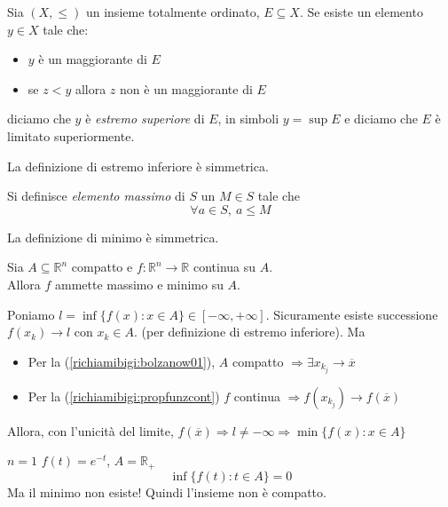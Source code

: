 \begin{defn}
Sia $(X,\leq)$ un insieme totalmente ordinato, $E\subseteq X$.
 Se esiste un elemento $y\in X$ tale che:
\begin{itemize}
\item $y$ è un maggiorante di $E$
\item se $z<y$ allora $z$ non è un maggiorante di $E$
\end{itemize}
diciamo che $y$ è \emph{estremo superiore} di $E$, in simboli
 $y=\sup E$ e diciamo che $E$ è limitato superiormente.
\end{defn}
La definizione di estremo inferiore è simmetrica.

\begin{defn}[Massimo]
Si definisce \emph{elemento massimo} di $S$  un $M \in S$
 tale che
$$\forall a \in S,\ a\leq M$$
\end{defn}
La definizione di minimo è simmetrica.


\begin{theo}
 Sia $A \subseteq \mathbb{R}^n$ compatto e
 $f: \mathbb{R}^{n} \rightarrow \mathbb{R}$ continua su $A$. \\
Allora $f$ ammette massimo e minimo su $A$.
\end{theo}

\begin{thproof}
Poniamo $ l = \inf \{f(x):  x \in A \} \in [ -\infty, + \infty]$.
Sicuramente esiste successione $f(x_k) \rightarrow l$ con $x_k \in A$. (per definizione di estremo inferiore). Ma
\begin{itemize}
\item Per la  (\ref{richiamibigi:bolzanow01}), $A$ compatto $\Rightarrow \exists x_{k_{j}} \rightarrow \overline{x}$

\item  Per la  (\ref{richiamibigi:propfunzcont})
$f$ continua $\Rightarrow  f(x_{k_{j}}) \rightarrow f(\overline{x})$ 
\end{itemize}
Allora, con l'unicità del limite,
 $f(\overline{x}) \Rightarrow l \neq -\infty \Rightarrow 
\min \{f(x): x \in A \}$

\end{thproof}

\begin{example}
 $n = 1$  $f(t) = e^{-t}$, $A = \mathbb{R}_{+}$
 $$\inf \{ f(t): t \in A \} = 0$$ 
Ma il minimo non esiste! Quindi l'insieme non è compatto.
\end{example}

